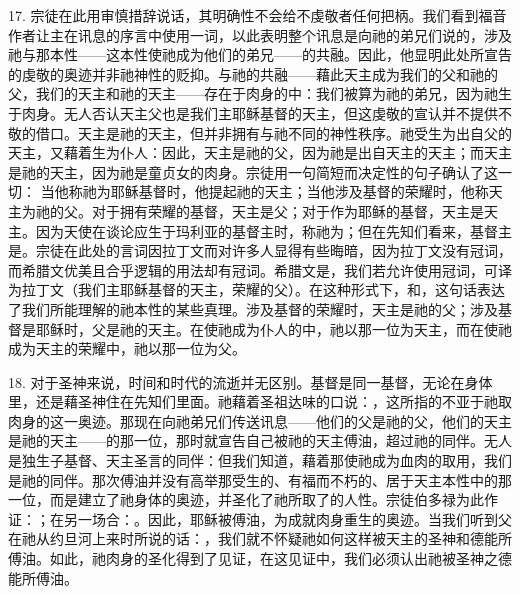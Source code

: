 17. 宗徒在此用审慎措辞说话，其明确性不会给不虔敬者任何把柄。我们看到福音作者让主在讯息的序言中使用一词，以此表明整个讯息是向祂的弟兄们说的，涉及祂与那本性——这本性使祂成为他们的弟兄——的共融。因此，他显明此处所宣告的虔敬的奥迹并非祂神性的贬抑。与祂的共融——藉此天主成为我们的父和祂的父，我们的天主和祂的天主——存在于肉身的中：我们被算为祂的弟兄，因为祂生于肉身。无人否认天主父也是我们主耶稣基督的天主，但这虔敬的宣认并不提供不敬的借口。天主是祂的天主，但并非拥有与祂不同的神性秩序。祂受生为出自父的天主，又藉着生为仆人：因此，天主是祂的父，因为祂是出自天主的天主；而天主是祂的天主，因为祂是童贞女的肉身。宗徒用一句简短而决定性的句子确认了这一切： 当他称祂为耶稣基督时，他提起祂的天主；当他涉及基督的荣耀时，他称天主为祂的父。对于拥有荣耀的基督，天主是父；对于作为耶稣的基督，天主是天主。因为天使在谈论应生于玛利亚的基督主时，称祂为；但在先知们看来，基督主是。宗徒在此处的言词因拉丁文而对许多人显得有些晦暗，因为拉丁文没有冠词，而希腊文优美且合乎逻辑的用法却有冠词。希腊文是，我们若允许使用冠词，可译为拉丁文（我们主耶稣基督的天主，荣耀的父）。在这种形式下，和，这句话表达了我们所能理解的祂本性的某些真理。涉及基督的荣耀时，天主是祂的父；涉及基督是耶稣时，父是祂的天主。在使祂成为仆人的中，祂以那一位为天主，而在使祂成为天主的荣耀中，祂以那一位为父。\par

18. 对于圣神来说，时间和时代的流逝并无区别。基督是同一基督，无论在身体里，还是藉圣神住在先知们里面。祂藉着圣祖达味的口说：，这所指的不亚于祂取肉身的这一奥迹。那现在向祂弟兄们传送讯息——他们的父是祂的父，他们的天主是祂的天主——的那一位，那时就宣告自己被祂的天主傅油，超过祂的同伴。无人是独生子基督、天主圣言的同伴：但我们知道，藉着那使祂成为血肉的取用，我们是祂的同伴。那次傅油并没有高举那受生的、有福而不朽的、居于天主本性中的那一位，而是建立了祂身体的奥迹，并圣化了祂所取了的人性。宗徒伯多禄为此作证：；在另一场合：。因此，耶稣被傅油，为成就肉身重生的奥迹。当我们听到父在祂从约旦河上来时所说的话：，我们就不怀疑祂如何这样被天主的圣神和德能所傅油。如此，祂肉身的圣化得到了见证，在这见证中，我们必须认出祂被圣神之德能所傅油。\par

